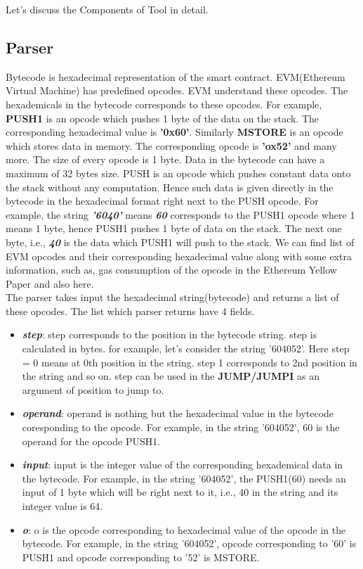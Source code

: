\noindent Let's discuss the Components of Tool in detail.
\subsection{Parser}
Bytecode is hexadecimal representation of the smart contract\cite{bytecode}. EVM(Ethereum Virtual Machine) has predefined opcodes. EVM understand these opcodes. The hexademicals in the bytecode corresponds to these opcodes. For example, \textbf{PUSH1} is an opcode which pushes 1 byte of the data on the stack. The corresponding hexadecimal value is \textbf{'0x60'}. Similarly \textbf{MSTORE} is an opcode which stores data in memory. The corresponding opcode is \textbf{'ox52'} and many more. The size of every opcode is 1 byte. Data in the bytecode can have a maximum of 32 bytes size. PUSH is an opcode which pushes constant data onto the stack without any computation. Hence such data is given directly in the bytecode in the hexadecimal format right next to the PUSH opcode. For example, the string \textbf{\emph{'6040'}} means \textbf{\emph{60}} corresponds to the PUSH1 opcode where 1 means 1 byte, hence PUSH1 pushes 1 byte of data on the stack. The next one byte, i.e., \textbf{\emph{40}} is the data which PUSH1 will push to the stack. We can find list of EVM opcodes and their corresponding hexadecimal value along with some extra information, such as, gas consumption of the opcode in the Ethereum Yellow Paper\cite{ethyellow} and also here\cite{ethop}.\\
The parser takes input the hexadecimal string(bytecode) and returns a list of these opcodes.
The list which parser returns have 4 fields.
\begin{itemize}
    \item \textbf{\emph{step}}: step corresponds to the position in the bytecode string. step is calculated in bytes. for example, let's consider the string '604052'. Here step = 0 means at 0th position in the string. step 1 corresponds to 2nd position in the string and so on. step can be used in the \textbf{JUMP/JUMPI} as an argument of position to jump to.
    \item \textbf{\emph{operand}}: operand is nothing but the hexadecimal value in the bytecode coresponding to the opcode. For example, in the string '604052', 60 is the operand for the opcode PUSH1.
    \item \textbf{\emph{input}}: input is the integer value of the corresponding hexademical data in the bytecode. For example, in the string '604052', the PUSH1(60) needs an input of 1 byte which will be right next to it, i.e., 40 in the string and its integer value is 64.
    \item \textbf{\emph{o}}: o is the opcode corresponding to hexadecimal value of the opcode in the bytecode. For example, in the string '604052', opcode corresponding to '60' is PUSH1 and opcode corresponding to '52' is MSTORE.
    
\end{itemize}
